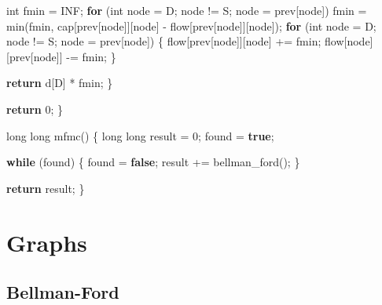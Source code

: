 \documentclass[10pt,]{article}
\newenvironment{Shaded}{}{}
\newcommand{\KeywordTok}[1]{\textcolor[rgb]{0.00,0.44,0.13}{\textbf{{#1}}}}
\newcommand{\DataTypeTok}[1]{\textcolor[rgb]{0.56,0.13,0.00}{{#1}}}
\newcommand{\DecValTok}[1]{\textcolor[rgb]{0.25,0.63,0.44}{{#1}}}
\newcommand{\NormalTok}[1]{{#1}}
\begin{document}
\begin{Shaded}
\begin{Highlighting}[]
    \DataTypeTok{int} \NormalTok{fmin = INF;}
    \KeywordTok{for} \NormalTok{(}\DataTypeTok{int} \NormalTok{node = D; node != S; node = prev[node])}
      \NormalTok{fmin = min(fmin, cap[prev[node]][node] - flow[prev[node]][node]);}
    \KeywordTok{for} \NormalTok{(}\DataTypeTok{int} \NormalTok{node = D; node != S; node = prev[node]) \{}
      \NormalTok{flow[prev[node]][node] += fmin;}
      \NormalTok{flow[node][prev[node]] -= fmin;}
    \NormalTok{\}}

    \KeywordTok{return} \NormalTok{d[D] * fmin;}
  \NormalTok{\} }

  \KeywordTok{return} \DecValTok{0}\NormalTok{;}
\NormalTok{\}}

\DataTypeTok{long} \DataTypeTok{long} \NormalTok{mfmc()}
\NormalTok{\{}
  \DataTypeTok{long} \DataTypeTok{long} \NormalTok{result = }\DecValTok{0}\NormalTok{;}
  \NormalTok{found = }\KeywordTok{true}\NormalTok{;}

  \KeywordTok{while} \NormalTok{(found) \{}
    \NormalTok{found = }\KeywordTok{false}\NormalTok{;}
    \NormalTok{result += bellman_ford();}
  \NormalTok{\}}

  \KeywordTok{return} \NormalTok{result;}
\NormalTok{\}}
\end{Highlighting}
\end{Shaded}

\section{Graphs}

\subsection{Bellman-Ford}
\end{document}
